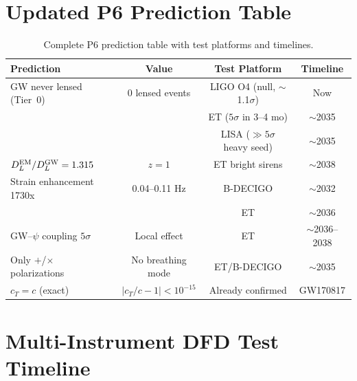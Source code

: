 \documentclass[11pt]{article}
\begin{document}
\section{Updated P6 Prediction Table}
\label{sec:predictions}

\begin{table}[h]
\centering
\small
\begin{tabular}{lccc}
\toprule
\textbf{Prediction} & \textbf{Value} & \textbf{Test Platform} &
  \textbf{Timeline} \\
\midrule
GW never lensed (Tier~0) & 0 lensed events & LIGO O4 (null, $\sim$1.1$\sigma$) & Now \\
 & & ET ($5\sigma$ in 3--4 mo) & $\sim$2035 \\
 & & LISA ($\gg 5\sigma$ heavy seed) & $\sim$2035 \\
$D_L^{\rm EM}/D_L^{\rm GW} = 1.315$ & $z = 1$ & ET bright sirens & $\sim$2038 \\
Strain enhancement 1730x & 0.04--0.11 Hz & B-DECIGO & $\sim$2032 \\
 & & ET & $\sim$2036 \\
GW--$\psi$ coupling $5\sigma$ & Local effect & ET & $\sim$2036--2038 \\
Only $+$/$\times$ polarizations & No breathing mode & ET/B-DECIGO & $\sim$2035 \\
$c_T = c$ (exact) & $|c_T/c - 1| < 10^{-15}$ & Already confirmed & GW170817 \\
\bottomrule
\end{tabular}
\caption{Complete P6 prediction table with test platforms and timelines.}
\end{table}

\section{Multi-Instrument DFD Test Timeline}
\label{sec:timeline}
\end{document}

